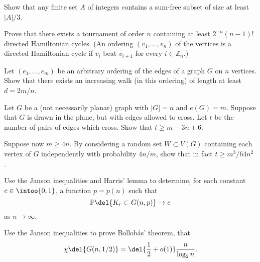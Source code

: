 \documentclass[english]{IMTexam}
\begin{document}
\begin{questions}
		\question Show that any finite set $ A $ of integers contains a sum-free subset of size at least $ |A|/3 $.
		
		\begin{solution}
			
		\end{solution}
	
		\question Prove that there exists a tournament of order $ n $ containing at least $ 2^{−n}(n − 1)! $ directed Hamiltonian cycles. (An ordering $ (v_1, \ldots, v_n) $ of the vertices is a directed Hamiltonian cycle if $ v_i $ beat $ v_{i+1} $ for every $ i \in \mathbb{Z}_n $.)
		
		\begin{solution}
			
		\end{solution}
	
		\question Let $ (e_1, \ldots, e_m) $ be an arbitrary ordering of the edges of a graph $ G $ on $ n $ vertices. Show that there exists an increasing walk (in this ordering) of length at least $ d = 2m/n $.
		
		\begin{solution}
			
		\end{solution}
	
		\question Let $ G $ be a (not necessarily planar) graph with $ |G| = n $ and $ e(G) = m $. Suppose that $ G $ is drawn in the plane, but with edges allowed to cross. Let $ t $ be the number of pairs of edges which cross. Show that $ t \geqslant m − 3n + 6 $.
		
		Suppose now $ m \geqslant 4n $. By considering a random set $ W \subset V(G) $ containing each vertex of $ G $ independently with probability $ 4n/m $, show that in fact $ t \geqslant m^{3}/64n^{2} $ .
		
		\begin{solution}
			
		\end{solution}
	
		\question Use the Janson inequalities and Harris’ lemma to determine, for each constant $ c \in \intoo{0,1} $, a function $ p = p(n) $ such that
		\[ \mathbb{P}\del{K_r \subset G(n, p)} \to c \]
		as $ n \to \infty $.
		
		\begin{solution}
			
		\end{solution}
	
		\question Use the Janson inequalities to prove Bollobás’ theorem, that
		\[ \chi\del{G(n,1/2)}=\del{\dfrac{1}{2}+o(1)}\dfrac{n}{\log_2 n}. \]
		
		\begin{solution}
			
		\end{solution}
		
	\end{questions}
\end{document}

